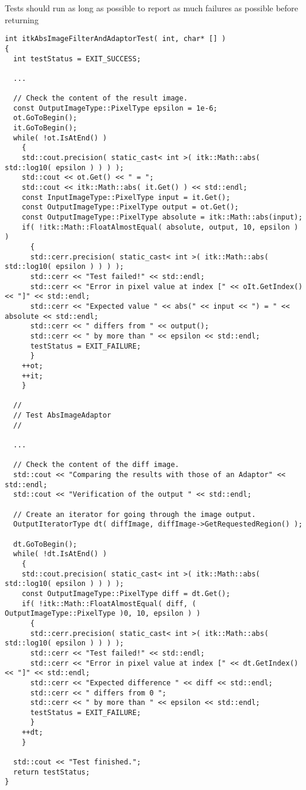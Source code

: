 Tests should run as long as possible to report as much failures as possible before returning

\small
\begin{verbatim}
int itkAbsImageFilterAndAdaptorTest( int, char* [] )
{
  int testStatus = EXIT_SUCCESS;

  ...

  // Check the content of the result image.
  const OutputImageType::PixelType epsilon = 1e-6;
  ot.GoToBegin();
  it.GoToBegin();
  while( !ot.IsAtEnd() )
    {
    std::cout.precision( static_cast< int >( itk::Math::abs( std::log10( epsilon ) ) ) );
    std::cout << ot.Get() << " = ";
    std::cout << itk::Math::abs( it.Get() ) << std::endl;
    const InputImageType::PixelType input = it.Get();
    const OutputImageType::PixelType output = ot.Get();
    const OutputImageType::PixelType absolute = itk::Math::abs(input);
    if( !itk::Math::FloatAlmostEqual( absolute, output, 10, epsilon ) )
      {
      std::cerr.precision( static_cast< int >( itk::Math::abs( std::log10( epsilon ) ) ) );
      std::cerr << "Test failed!" << std::endl;
      std::cerr << "Error in pixel value at index [" << oIt.GetIndex() << "]" << std::endl;
      std::cerr << "Expected value " << abs(" << input << ") = " << absolute << std::endl;
      std::cerr << " differs from " << output();
      std::cerr << " by more than " << epsilon << std::endl;
      testStatus = EXIT_FAILURE;
      }
    ++ot;
    ++it;
    }

  //
  // Test AbsImageAdaptor
  //

  ...

  // Check the content of the diff image.
  std::cout << "Comparing the results with those of an Adaptor" << std::endl;
  std::cout << "Verification of the output " << std::endl;

  // Create an iterator for going through the image output.
  OutputIteratorType dt( diffImage, diffImage->GetRequestedRegion() );

  dt.GoToBegin();
  while( !dt.IsAtEnd() )
    {
    std::cout.precision( static_cast< int >( itk::Math::abs( std::log10( epsilon ) ) ) );
    const OutputImageType::PixelType diff = dt.Get();
    if( !itk::Math::FloatAlmostEqual( diff, ( OutputImageType::PixelType )0, 10, epsilon ) )
      {
      std::cerr.precision( static_cast< int >( itk::Math::abs( std::log10( epsilon ) ) ) );
      std::cerr << "Test failed!" << std::endl;
      std::cerr << "Error in pixel value at index [" << dt.GetIndex() << "]" << std::endl;
      std::cerr << "Expected difference " << diff << std::endl;
      std::cerr << " differs from 0 ";
      std::cerr << " by more than " << epsilon << std::endl;
      testStatus = EXIT_FAILURE;
      }
    ++dt;
    }

  std::cout << "Test finished.";
  return testStatus;
}
\end{verbatim}
\normalsize

